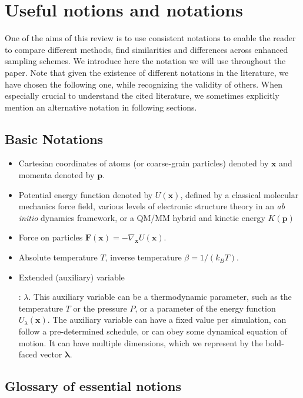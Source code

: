\documentclass[9pt,review]{livecoms}
\newcommand{\vx}{\mathbf{x}}
\newcommand{\vp}{\mathbf{p}}
\newcommand{\vF}{\mathbf{F}}
\begin{document}
\section{Useful notions and notations}
\label{sec:Notion_Notation}

One of the aims of this review is to use consistent notations to enable the reader to compare different methods, find similarities and differences across enhanced sampling
schemes. We introduce here the notation we will use throughout the paper. Note that given the existence of different notations in the literature, we have chosen the following one, while recognizing the validity of others. When especially crucial to understand the cited literature, we sometimes explicitly mention an alternative notation in following sections.

\subsection{Basic Notations}
\label{sec:Notation}
\begin{itemize}
\item Cartesian coordinates of atoms (or coarse-grain particles) denoted by $\vx$ and momenta denoted by $\vp$.
\item Potential energy function denoted by $U(\vx)$, defined by a classical molecular mechanics force field, various levels of electronic structure theory in an \emph{ab initio} dynamics framework, or a QM/MM hybrid and kinetic energy $K(\vp)$
\item Force on particles $\vF(\vx) = -\nabla_\vx U(\vx)$.
\item Absolute temperature $T$, inverse temperature $\beta = 1/(k_B T)$.
\item \hypertarget{ref:AuxVar} {Extended (auxiliary) variable}: $\lambda$. This auxiliary variable can be a thermodynamic parameter, such as the temperature $T$ or the pressure $P$, or a parameter of the energy function $U_\lambda(\vx)$. The auxiliary variable can have a fixed value per simulation, can follow a pre-determined schedule, or can obey some dynamical equation of motion. It can have multiple dimensions, which we represent by the bold-faced vector $\boldsymbol{\lambda}$.

\end{itemize}

\subsection{Glossary of essential notions}
\label{sec:glossary}
\end{document}
